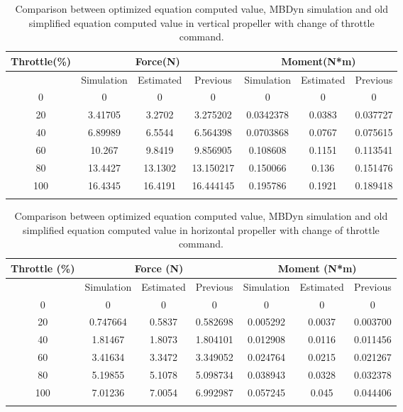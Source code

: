 \begin{table}[htbp]
\centering
\caption{Comparison between optimized equation computed value, MBDyn simulation and old simplified equation computed value in vertical propeller with change of throttle command.}

\begin{tabular}{c|ccc|ccc}
\hline
Throttle(\%) & \multicolumn{3}{c}{Force(N)} & \multicolumn{3}{c}{Moment(N*m)} \\
\hline
 & Simulation & Estimated & Previous & Simulation & Estimated & Previous  \\
 \hline
0   & 0        & 0        & 0        & 0         & 0        & 0         \\
20  & 3.41705  & 3.2702   & 3.275202 & 0.0342378 & 0.0383   & 0.037727  \\
40  & 6.89989  & 6.5544   & 6.564398 & 0.0703868 & 0.0767   & 0.075615  \\
60  & 10.267   & 9.8419   & 9.856905 & 0.108608  & 0.1151   & 0.113541  \\
80  & 13.4427  & 13.1302  & 13.150217& 0.150066  & 0.136    & 0.151476  \\
100 & 16.4345  & 16.4191  & 16.444145& 0.195786  & 0.1921   & 0.189418  \\
\hline
\label{tab:aero_rotor throttle V}
\end{tabular}
\end{table}

\begin{table}[htbp]
\centering
\caption{Comparison between optimized equation computed value, MBDyn simulation and old simplified equation computed value in horizontal propeller with change of throttle command.}
\begin{tabular}{c|ccc|ccc}
\hline
Throttle (\%) & \multicolumn{3}{c}{Force (N)} & \multicolumn{3}{c}{Moment (N*m)} \\
\hline
 & Simulation & Estimated & Previous & Simulation & Estimated & Previous \\
 \hline
0   & 0        & 0        & 0        & 0         & 0        & 0         \\
20  & 0.747664 & 0.5837   & 0.582698 & 0.005292  & 0.0037   & 0.003700  \\
40  & 1.81467  & 1.8073   & 1.804101 & 0.012908  & 0.0116   & 0.011456  \\
60  & 3.41634  & 3.3472   & 3.349052 & 0.024764  & 0.0215   & 0.021267  \\
80  & 5.19855  & 5.1078   & 5.098734 & 0.038943  & 0.0328   & 0.032378  \\
100 & 7.01236  & 7.0054   & 6.992987 & 0.057245  & 0.045    & 0.044406  \\
\hline
\label{tab:aero_rotor throttle H}
\end{tabular}
\end{table}

